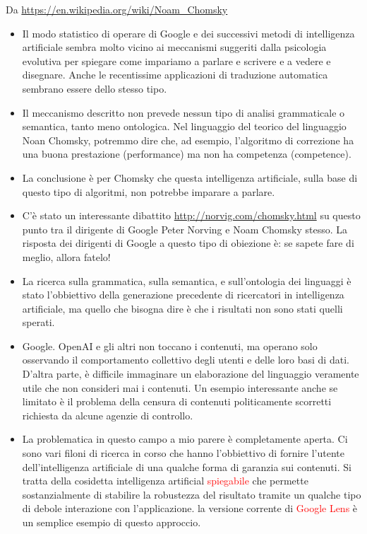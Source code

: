 \documentclass[xcolor=svgnames]{beamer}
\newcommand{\rosso}[1]{\textcolor{red}{#1}}
\renewcommand{\emph}{\rosso}
\begin{document}
\begin{frame}
  {\tiny Da \url{https://en.wikipedia.org/wiki/Noam_Chomsky}}
  
\begin{itemize}
    \item Il modo statistico di operare di Google e dei successivi metodi di intelligenza artificiale sembra molto vicino ai meccanismi suggeriti dalla psicologia evolutiva per spiegare come impariamo a parlare e scrivere e a vedere e disegnare. Anche le recentissime applicazioni di traduzione automatica sembrano essere dello stesso tipo.
    
\item Il meccanismo descritto non prevede nessun tipo di analisi grammaticale o semantica, tanto meno ontologica. Nel linguaggio del teorico del linguaggio Noan Chomsky, potremmo dire che, ad esempio, l'algoritmo di correzione ha una buona prestazione (performance) ma non ha competenza (competence).

\item La conclusione è per Chomsky che questa intelligenza artificiale, sulla base di questo tipo di algoritmi, non potrebbe imparare a parlare. 

\item C'è stato un interessante dibattito \url{http://norvig.com/chomsky.html} su questo punto tra il dirigente di Google Peter Norving e Noam Chomsky stesso. La risposta dei dirigenti di Google a questo tipo di obiezione è: se sapete fare di meglio, allora fatelo!

\item La ricerca sulla grammatica, sulla semantica, e sull'ontologia dei linguaggi è stato l'obbiettivo della generazione precedente di ricercatori in intelligenza artificiale, ma quello che bisogna dire è che i risultati non sono stati quelli sperati.

\item Google. OpenAI e gli altri  non toccano i contenuti, ma operano solo osservando il comportamento collettivo degli utenti e delle loro basi di dati. D'altra parte, è difficile immaginare un elaborazione del linguaggio veramente utile che non consideri mai i contenuti. Un esempio interessante anche se limitato è il problema della censura di contenuti politicamente scorretti  richiesta da alcune agenzie di controllo.

\item La problematica in questo campo a mio parere è completamente aperta. Ci sono vari filoni di ricerca in corso che hanno l'obbiettivo di fornire l'utente dell'intelligenza artificiale di una qualche forma di garanzia sui contenuti. Si tratta della cosidetta intelligenza artificial \emph{spiegabile} che permette sostanzialmente di stabilire la robustezza del risultato tramite un qualche tipo di debole interazione con l'applicazione. la versione corrente di \emph{Google Lens} è un semplice esempio di questo approccio.

\end{itemize}

\end{frame}
\end{document}
